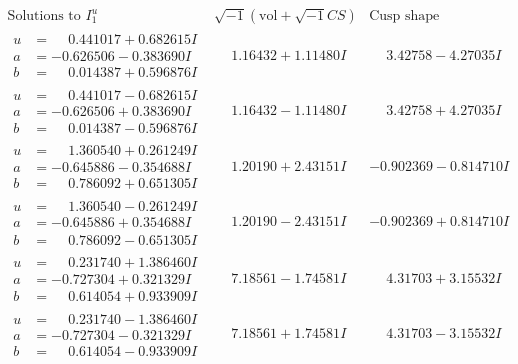 \documentclass[1p]{elsarticle_modified}
\theoremstyle{definition}
\newcommand{\I}{\sqrt{-1}}
\begin{document}
$$\begin{array}{c|c|c}  
\text{Solutions to }I^u_{1}& \I (\text{vol} + \sqrt{-1}CS) & \text{Cusp shape}\\
 \hline 
\begin{aligned}
u &= \phantom{-}0.441017 + 0.682615 I \\
a &= -0.626506 - 0.383690 I \\
b &= \phantom{-}0.014387 + 0.596876 I\end{aligned}
 & \phantom{-}1.16432 + 1.11480 I & \phantom{-}3.42758 - 4.27035 I \\ \hline\begin{aligned}
u &= \phantom{-}0.441017 - 0.682615 I \\
a &= -0.626506 + 0.383690 I \\
b &= \phantom{-}0.014387 - 0.596876 I\end{aligned}
 & \phantom{-}1.16432 - 1.11480 I & \phantom{-}3.42758 + 4.27035 I \\ \hline\begin{aligned}
u &= \phantom{-}1.360540 + 0.261249 I \\
a &= -0.645886 - 0.354688 I \\
b &= \phantom{-}0.786092 + 0.651305 I\end{aligned}
 & \phantom{-}1.20190 + 2.43151 I & -0.902369 - 0.814710 I \\ \hline\begin{aligned}
u &= \phantom{-}1.360540 - 0.261249 I \\
a &= -0.645886 + 0.354688 I \\
b &= \phantom{-}0.786092 - 0.651305 I\end{aligned}
 & \phantom{-}1.20190 - 2.43151 I & -0.902369 + 0.814710 I \\ \hline\begin{aligned}
u &= \phantom{-}0.231740 + 1.386460 I \\
a &= -0.727304 + 0.321329 I \\
b &= \phantom{-}0.614054 + 0.933909 I\end{aligned}
 & \phantom{-}7.18561 - 1.74581 I & \phantom{-}4.31703 + 3.15532 I \\ \hline\begin{aligned}
u &= \phantom{-}0.231740 - 1.386460 I \\
a &= -0.727304 - 0.321329 I \\
b &= \phantom{-}0.614054 - 0.933909 I\end{aligned}
 & \phantom{-}7.18561 + 1.74581 I & \phantom{-}4.31703 - 3.15532 I \\ \hline\begin{aligned}

\end{aligned}
\end{array}$$
\end{document}

